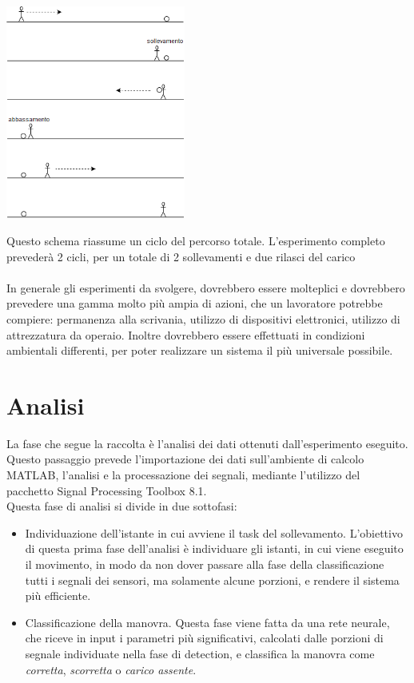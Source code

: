 \documentclass[a4paper, oneside]{book}
\begin{document}
\vspace{3mm}
\begin{minipage}{\linewidth}
\begin{center}
\includegraphics[width=59mm,scale=0.7]{./images/esperimento1.png} 
\vspace{3mm}
\end{center}
\end{minipage}
Questo schema riassume un ciclo del percorso totale. L’esperimento completo prevederà 2 cicli, per un totale di 2 sollevamenti e due rilasci del carico\\ \\
In generale gli esperimenti da svolgere, dovrebbero essere molteplici e dovrebbero prevedere una gamma molto più ampia di azioni, che un lavoratore potrebbe compiere: permanenza alla scrivania, utilizzo di dispositivi elettronici, utilizzo di attrezzatura da operaio. Inoltre dovrebbero essere effettuati in condizioni ambientali differenti, per poter realizzare un sistema il più universale possibile.

\clearpage


\chapter{Analisi}
La fase che segue la raccolta è l'analisi dei dati ottenuti dall'esperimento eseguito. Questo passaggio prevede l'importazione dei dati sull'ambiente di calcolo MATLAB, l'analisi e la processazione dei segnali, mediante l'utilizzo  del pacchetto Signal Processing Toolbox 8.1. \\
Questa fase di analisi si divide in due sottofasi:
\begin {itemize}
\item Individuazione dell'istante in cui avviene il task del sollevamento. L'obiettivo di questa prima fase dell'analisi è individuare gli istanti, in cui viene eseguito il movimento, in modo da non dover passare alla fase della classificazione tutti i segnali dei sensori, ma solamente alcune porzioni, e rendere il sistema più efficiente.
\item Classificazione della manovra. Questa fase viene fatta da una rete neurale, che riceve in input i parametri più significativi, calcolati dalle porzioni di segnale individuate nella fase di detection, e classifica la manovra come \textit{corretta}, \textit{scorretta} o \textit{carico assente}.
\end{itemize}
\end{document}
